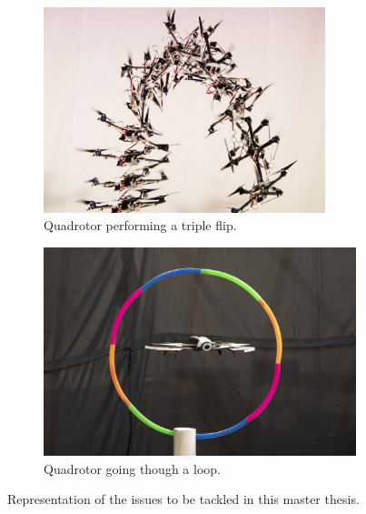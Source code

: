 \documentclass{thesisreport}
\begin{document}
\begin{figure}[h]
     \centering
     \begin{subfigure}[h]{0.45\textwidth}
         \centering
         \includegraphics[width=0.9\textwidth]{Images/Introduction/flip}
    \caption{Quadrotor performing a triple flip.\cite{flip}}
         \label{triple_flip}
     \end{subfigure}
     \hfill
     \begin{subfigure}[h]{0.45\textwidth}
         \centering
         \includegraphics[width=\textwidth]{Images/Introduction/constrained_environment}
         \caption[Caption for LOF]{Quadrotor going though a loop.\protect\footnotemark[1]}
         \label{drone_hulahoop}
     \end{subfigure}
        \caption{Representation of the issues to be tackled in this master thesis.}
        \label{fig:three graphs}
\end{figure}
\end{document}
